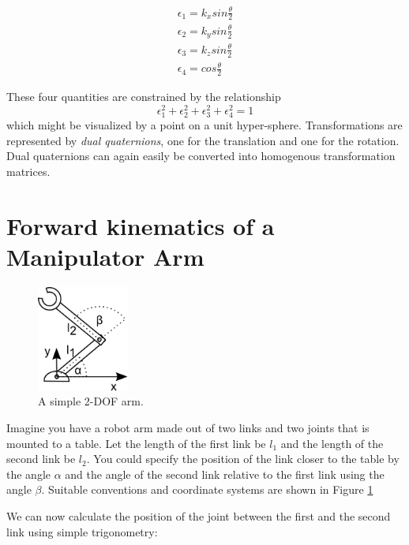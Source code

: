 \begin{eqnarray}
\epsilon_1=k_x sin \frac{\theta}{2}\\
\epsilon_2=k_y sin \frac{\theta}{2}\\
\epsilon_3=k_z sin \frac{\theta}{2}\\
\epsilon_4=cos\frac{\theta}{2}
\end{eqnarray}

These four quantities are constrained by the relationship
\begin{equation}
\epsilon_1^2+\epsilon_2^2+\epsilon_3^2+\epsilon_4^2=1
\end{equation}
which might be visualized by a point on a unit hyper-sphere. Transformations are represented by \emph{dual quaternions}, one for the translation and one for the rotation. Dual quaternions can again easily be converted into homogenous transformation matrices.

\section{Forward kinematics of a Manipulator Arm}

\begin{figure}[!htb]%
  \begin{center}
    \includegraphics[width=0.27\textwidth]{figs/fwk2dofarm}
  \end{center}
  \caption{A simple 2-DOF arm.\label{fig:fwk2dofarm}}
\end{figure}

Imagine you have a robot arm made out of two links and two joints that is mounted to a table. Let the length of the first link be $l_1$ and the length of the second link be $ l_2$. You could specify the position of the link closer to the table by the angle $ \alpha$ and the angle of the second link relative to the first link using the angle $ \beta$. Suitable conventions and coordinate systems are shown in Figure \ref{fig:fwk2dofarm}

We can now calculate the position of the joint between the first and the second link using simple trigonometry:

